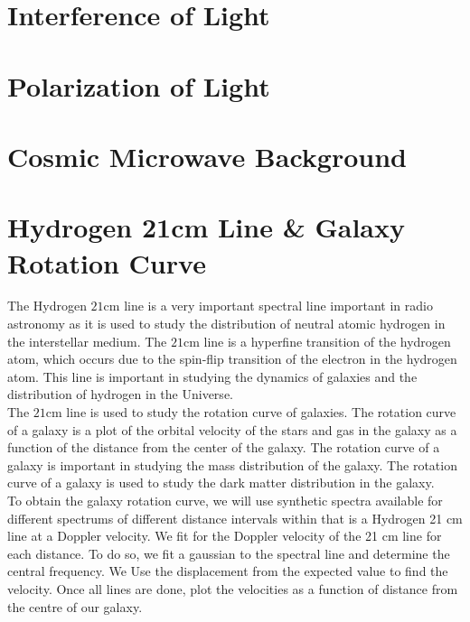 \clearpage

\section{Interference of Light}

\clearpage

\section{Polarization of Light}

\clearpage

\section{Cosmic Microwave Background}

\clearpage

\section{Hydrogen 21cm Line \& Galaxy Rotation Curve}

The Hydrogen $21$cm line is a very important spectral line important in radio astronomy as it is used to study the distribution of neutral atomic hydrogen in the interstellar medium. The $21$cm line is a hyperfine transition of the hydrogen atom, which occurs due to the spin-flip transition of the electron in the hydrogen atom. This line is important in studying the dynamics of galaxies and the distribution of hydrogen in the Universe. \\

The $21$cm line is used to study the rotation curve of galaxies. The rotation curve of a galaxy is a plot of the orbital velocity of the stars and gas in the galaxy as a function of the distance from the center of the galaxy. The rotation curve of a galaxy is important in studying the mass distribution of the galaxy. The rotation curve of a galaxy is used to study the dark matter distribution in the galaxy. \\

To obtain the galaxy rotation curve, we will use synthetic spectra available for different spectrums of different distance intervals within that is a Hydrogen 21 cm line at a Doppler velocity. We fit for the Doppler velocity of the 21 cm line for each distance. To do so, we fit a gaussian to the spectral line and determine the central frequency. We Use the displacement from the expected value to find the velocity. Once all lines are done, plot the velocities as a function of distance from the centre of our galaxy.

